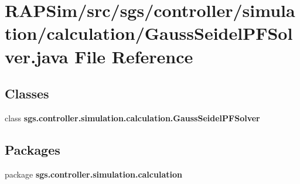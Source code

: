 \section{R\-A\-P\-Sim/src/sgs/controller/simulation/calculation/\-Gauss\-Seidel\-P\-F\-Solver.java File Reference}
\label{_gauss_seidel_p_f_solver_8java}
\subsection*{Classes}
\begin{DoxyCompactItemize}
\item 
class {\bf sgs.\-controller.\-simulation.\-calculation.\-Gauss\-Seidel\-P\-F\-Solver}
\end{DoxyCompactItemize}
\subsection*{Packages}
\begin{DoxyCompactItemize}
\item 
package {\bf sgs.\-controller.\-simulation.\-calculation}
\end{DoxyCompactItemize}

